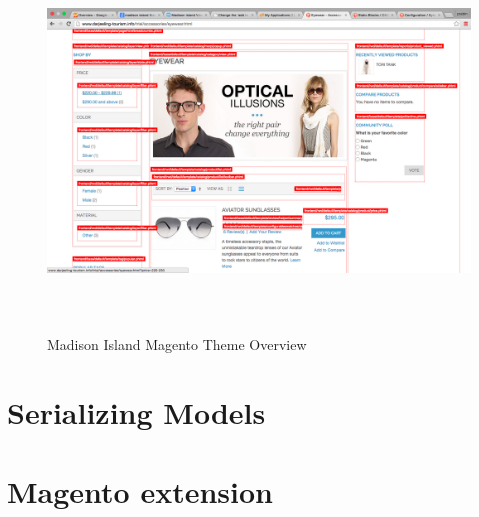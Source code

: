 \vspace{0.5cm}
\begin{figure}[H]
  \centering
    \includegraphics[height=10cm]{images/madison-island-theme.png}
  \caption{Madison Island Magento Theme Overview}
  \label{fig:madison-island-magento-theme-overview}
\end{figure}
\vspace{0.5cm}





\section{Serializing Models}

\section{Magento extension}


